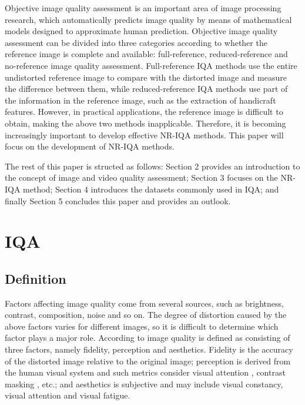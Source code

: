\documentclass{article}
\begin{document}
Objective image quality assessment is an important area of image processing research, which  automatically predicts image quality by means of mathematical models designed to approximate human prediction. Objective image quality assessment can be divided into three categories according to whether the reference image is complete and available: full-reference, reduced-reference and no-reference image quality assessment. Full-reference IQA methods use the entire undistorted reference image to compare with the distorted image and measure the difference between them, while reduced-reference IQA methods use part of the information in the reference image, such as the extraction of handicraft features. However, in practical applications, the reference image is difficult to obtain, making the above two methods inapplicable. Therefore, it is becoming increasingly important to develop effective NR-IQA methods. This paper will focus on the development of NR-IQA methods.

The rest of this paper is structed as follows: Section 2 provides an introduction to the concept of image and video quality assessment; Section 3 focuses on the NR-IQA method; Section 4 introduces the datasets commonly used in IQA; and finally Section 5 concludes this paper and provides an outlook.


\section{IQA}
\label{IQA}

\subsection{Definition}
\label{definition}
Factors affecting image quality come from several sources, such as brightness, contrast, composition, noise and so on. The degree of distortion caused by the above factors varies for different images, so it is difficult to determine which factor plays a major role. According to \cite{he2014objective} image quality is defined as consisting of three factors, namely fidelity, perception and aesthetics. Fidelity is the accuracy of the distorted image relative to the original image; perception is derived from the human visual system and such metrics consider visual attention \cite{borji2012state}, contrast masking \cite{klein1997seven}, etc.; and aesthetics is subjective and may include \cite{he2014objective} visual constancy, visual attention and visual fatigue.
\end{document}
